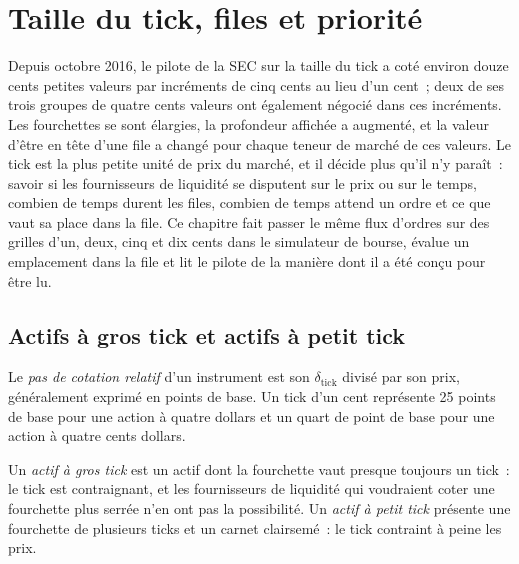 \chapter{Taille du tick, files et priorité}\label{ch:mx:tick-size-queues-and-priority}

Depuis octobre 2016, le pilote de la SEC sur la taille du tick a coté environ douze cents petites valeurs par incréments de cinq cents au lieu d'un cent~; deux de ses trois groupes de
quatre cents valeurs ont également négocié dans ces incréments. Les fourchettes se sont élargies, la profondeur affichée a augmenté, et la valeur d'être en tête d'une file a changé pour chaque teneur de marché de
ces valeurs. Le tick est la plus petite unité de prix du marché, et il décide plus qu'il n'y paraît~: savoir si les fournisseurs de liquidité se disputent sur le prix ou sur
le temps, combien de temps durent les files, combien de temps attend un ordre et ce que vaut sa place dans la file. Ce chapitre fait passer le même flux d'ordres sur des grilles d'un, deux,
cinq et dix cents dans le simulateur de bourse, évalue un emplacement dans la file et lit le pilote de la manière dont il a été conçu pour être lu.

\section{Actifs à gros tick et actifs à petit tick}

\begin{definition}\label{def:mx:tick-size-queues-and-priority:relative}
Le \emph{pas de cotation relatif} d'un instrument est son  $\delta_{\mathrm{tick}}$ divisé par son prix, généralement exprimé en points de base.
Un tick d'un cent représente 25 points de base pour une action à quatre dollars et un quart de point de base pour une action à quatre cents dollars.
\end{definition}

\begin{definition}\label{def:mx:tick-size-queues-and-priority:large}
Un \emph{actif à gros tick} est un actif dont la fourchette vaut presque toujours un tick~: le tick est contraignant, et les fournisseurs de liquidité qui voudraient
coter une fourchette plus serrée n'en ont pas la possibilité. Un \emph{actif à petit tick} présente une fourchette de plusieurs ticks et un carnet clairsemé~: le tick
contraint à peine les prix.
\end{definition}

